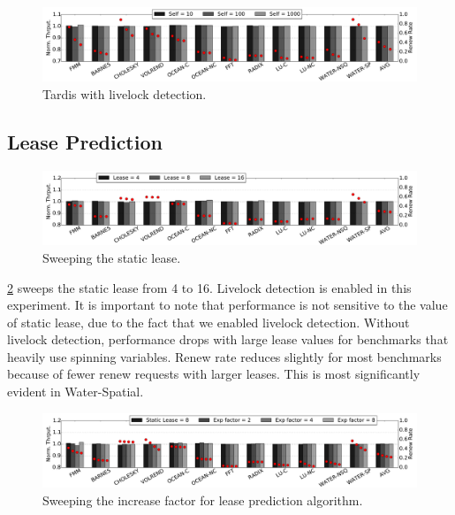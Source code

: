 \documentclass[12pt]{article}
\begin{document}
	\begin{figure}
		\centering
		\includegraphics[width=0.95\columnwidth]{figs/selfincr_live.pdf}
		\caption{ Tardis with livelock detection. }
		\label{fig:self-live}
	\end{figure}
	
	
	\subsection{Lease Prediction}                         \label{sec:opt-lease}                       
	
	\begin{figure}
		\centering
		\includegraphics[width=0.95\columnwidth]{figs/static.pdf}
		\caption{ Sweeping the static lease.  }
		\label{fig:static}
	\end{figure}
	
	
	\cref{fig:static} sweeps the static lease from 4 to 16. Livelock 
	detection is enabled in this experiment. It is important to note that 
	performance is not sensitive to the value of static lease, due to the 
	fact that we enabled livelock detection. Without livelock detection, 
	performance drops with large lease values for benchmarks that heavily 
	use spinning variables. Renew rate reduces slightly for most 
	benchmarks because of fewer renew requests with larger leases. This is 
	most significantly evident in Water-Spatial.
	
	\begin{figure}
		\centering
		\includegraphics[width=0.95\columnwidth]{figs/exp.pdf}
		\caption{ Sweeping the increase factor for lease prediction 
			algorithm.}
		\label{fig:exp}
	\end{figure}
	
\end{document}
